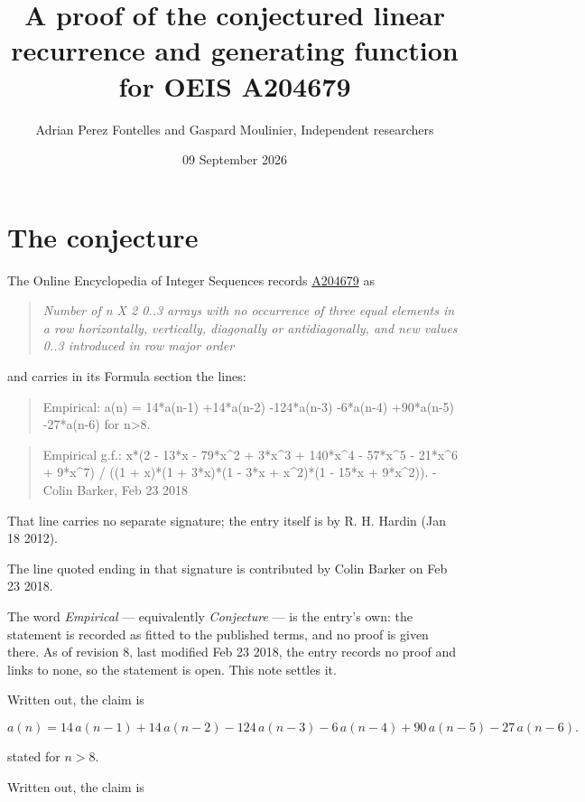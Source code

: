 \documentclass[11pt]{article}
\title{A proof of the conjectured linear recurrence and generating function for OEIS A204679}
\author{Adrian Perez Fontelles and Gaspard Moulinier, Independent researchers}
\date{09 September 2026}
\theoremstyle{definition}
\begin{document}
\maketitle
\section{The conjecture}

The Online Encyclopedia of Integer Sequences records \href{https://oeis.org/A204679}{A204679} as

\begin{quote}\itshape Number of n X 2 0..3 arrays with no occurrence of three equal elements in a row horizontally, vertically, diagonally or antidiagonally, and new values 0..3 introduced in row major order\end{quote}

and carries in its Formula section the lines:

\begin{quote}\ttfamily Empirical: a(n) = 14*a(n-1) +14*a(n-2) -124*a(n-3) -6*a(n-4) +90*a(n-5) -27*a(n-6) for n>8.\end{quote}

\begin{quote}\ttfamily Empirical g.f.: x*(2 - 13*x - 79*x\textasciicircum{}2 + 3*x\textasciicircum{}3 + 140*x\textasciicircum{}4 - 57*x\textasciicircum{}5 - 21*x\textasciicircum{}6 + 9*x\textasciicircum{}7) / ((1 + x)*(1 + 3*x)*(1 - 3*x + x\textasciicircum{}2)*(1 - 15*x + 9*x\textasciicircum{}2)). - Colin Barker, Feb 23 2018\end{quote}

That line carries no separate signature; the entry itself is by R. H. Hardin (Jan 18 2012).

The line quoted ending in that signature is contributed by Colin Barker on Feb 23 2018.

The word {\itshape Empirical} --- equivalently {\itshape Conjecture} --- is the entry's own: the statement is recorded as fitted to the published terms, and no proof is given there. As of revision 8, last modified Feb 23 2018, the entry records no proof and links to none, so the statement is open. This note settles it.

Written out, the claim is

\[a(n) = 14\,a(n-1) + 14\,a(n-2) - 124\,a(n-3) - 6\,a(n-4) + 90\,a(n-5) - 27\,a(n-6).\]

stated for $n > 8$.

Written out, the claim is
\end{document}
